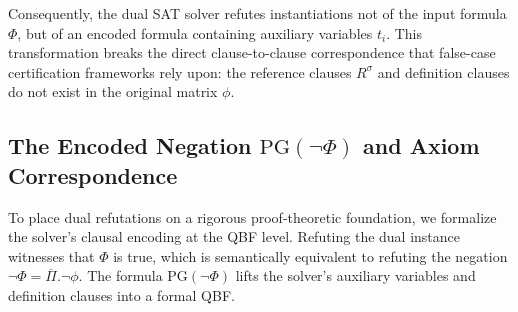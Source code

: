 \documentclass[runningheads]{llncs}
\newcommand{\PG}{\mathrm{PG}}
\begin{document}
Consequently, the dual SAT solver refutes instantiations not of the input formula $\Phi$, but of an encoded formula containing auxiliary variables $t_i$.
This transformation breaks the direct clause-to-clause correspondence that false-case certification frameworks rely upon: the reference clauses $R^\sigma$ and definition clauses do not exist in the original matrix $\phi$.

\subsection{The Encoded Negation \texorpdfstring{$\PG(\neg\Phi)$}{PG(not Phi)} and Axiom Correspondence}
\label{subsec:pg-encoding}

To place dual refutations on a rigorous proof-theoretic foundation, we formalize the solver's clausal encoding at the QBF level.
Refuting the dual instance witnesses that $\Phi$ is true, which is semantically equivalent to refuting the negation $\neg\Phi = \overline{\Pi}.\neg\phi$.
The formula $\PG(\neg\Phi)$ lifts the solver's auxiliary variables and definition clauses into a formal QBF.
\end{document}
